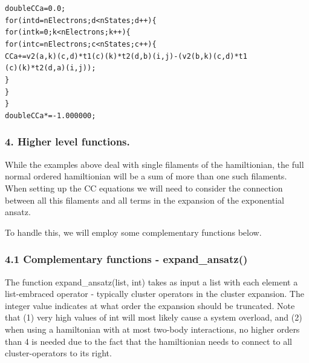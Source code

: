 \documentclass[letterpaper,10pt,english]{/Users/kinealicegulbrandsen/anaconda/lib/python2.7/site-packages/sphinx/texinputs/sphinxhowto}
\newenvironment{InvisibleVerbatim}
        {\begin{mdframed}[leftmargin=0.1\linewidth,innerleftmargin=3pt,innerrightmargin=3pt, userdefinedwidth=1\linewidth, linewidth=0pt, linecolor=white, usetwoside=false]}
        {\end{mdframed}}
\begin{document}
    

        
        

            
                \begin{InvisibleVerbatim}
                \vspace{-0.5\baselineskip}
\begin{alltt}
double CCa = 0.0;
for(int d = nElectrons; d < nStates; d ++)\{
    for(int k = 0; k < nElectrons; k ++)\{
        for(int c = nElectrons; c < nStates; c ++)\{
            CCa += v2(a,k)(c,d)*t1(c)(k)*t2(d,b)(i,j)-(v2(b,k)(c,d)*t1
(c)(k)*t2(d,a)(i,j));
        \}
    \}
\}
double CCa *= -1.000000;

\end{alltt}

            \end{InvisibleVerbatim}
            
        
    
\subsubsection{4. Higher level
functions.}\label{higher-level-functions.}

While the examples above deal with single filaments of the hamiltionian,
the full normal ordered hamiltionian will be a sum of more than one such
filaments. When setting up the CC equations we will need to consider the
connection between all this filaments and all terms in the expansion of
the exponential ansatz.

To handle this, we will employ some complementary functions below.\subsubsection{4.1 Complementary functions -
expand\_ansatz()}\label{complementary-functions---expandux5fansatz}

The function expand\_ansatz(list, int) takes as input a list with each
element a list-embraced operator - typically cluster operators in the
cluster expansion. The integer value indicates at what order the
expansion should be truncated. Note that (1) very high values of int
will most likely cause a system overload, and (2) when using a
hamiltonian with at most two-body interactions, no higher orders than 4
is needed due to the fact that the hamiltionian needs to connect to all
cluster-operators to its right.
\end{document}
